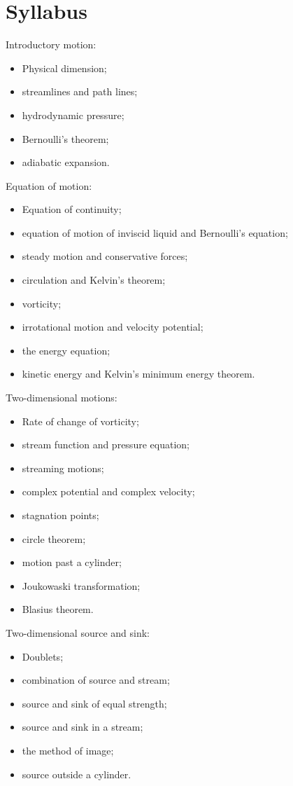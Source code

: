 \documentclass[12pt,class=book,crop=false]{standalone}
\begin{document}
\chapter*{Syllabus}
Introductory motion:
\begin{itemize}[noitemsep]
    \item Physical dimension;
    \item streamlines and path lines;
    \item hydrodynamic pressure;
    \item Bernoulli's theorem;
    \item adiabatic expansion.
\end{itemize}
Equation of motion:
\begin{itemize}[noitemsep]
    \item Equation of continuity;
    \item equation of motion of inviscid liquid and Bernoulli's equation;
    \item steady motion and conservative forces;
    \item circulation and Kelvin's theorem;
    \item vorticity;
    \item irrotational motion and velocity potential;
    \item the energy equation;
    \item kinetic energy and Kelvin's minimum energy theorem.
\end{itemize}
Two-dimensional motions:
\begin{itemize}[noitemsep]
    \item Rate of change of vorticity;
    \item stream function and pressure equation;
    \item streaming motions;
    \item complex potential and complex velocity;
    \item stagnation points;
    \item circle theorem;
    \item motion past a cylinder;
    \item Joukowaski transformation;
    \item Blasius theorem.
\end{itemize}
Two-dimensional source and sink:
\begin{itemize}[noitemsep]
    \item Doublets;
    \item combination of source and stream;
    \item source and sink of equal strength;
    \item source and sink in a stream;
    \item the method of image;
    \item source outside a cylinder.
\end{itemize}
\end{document}
